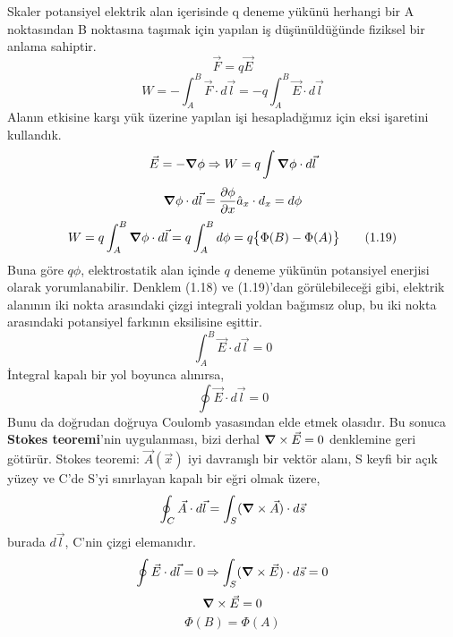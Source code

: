 \begin{theorem}
Skaler potansiyel elektrik alan içerisinde q deneme yükünü herhangi bir A noktasından B noktasına taşımak için yapılan iş düşünüldüğünde fiziksel bir anlama sahiptir.
\[\Vec{F} = q \Vec{E} \]
\[ W = - \int_{A}^{B} \Vec{F} \cdot d\Vec{l} = -q \int_{A}^{B} \Vec{E} \cdot d\Vec{l} \tag{1.18}\]
Alanın etkisine karşı yük üzerine yapılan işi hesapladığımız için eksi işaretini kullandık.
\[ \Vec{E} = - \grad \phi \Rightarrow W = q \int \grad \phi \cdot  d\Vec{l} \]
\[ \grad \phi \cdot  d\Vec{l} = \dfrac{\partial \phi}{\partial x} \hat{a}_{x} \cdot d_{x} = d \phi \]
\[ W = q \int_{A}^{B} \grad \phi \cdot  d\Vec{l} = q \int_{A}^{B} d \phi = q \big\{ \Phi(B) - \Phi(A) \big\} \tag{1.19} \]
Buna göre $q\phi$, elektrostatik alan içinde $q$ deneme yükünün potansiyel enerjisi olarak yorumlanabilir. Denklem (1.18) ve (1.19)'dan görülebileceği gibi, elektrik alanının iki nokta arasındaki çizgi integrali yoldan bağımsız olup, bu iki nokta arasındaki potansiyel farkının eksilisine eşittir.
\[ \int_{A}^{B} \Vec{E} \cdot d\Vec{l} = 0 \tag{1.20}\]
İntegral kapalı bir yol boyunca alınırsa,
\[ \oint \Vec{E} \cdot d\Vec{l} = 0 \tag{1.21} \]
Bunu da doğrudan doğruya Coulomb yasasından elde etmek olasıdır. Bu sonuca \textbf{Stokes teoremi}'nin uygulanması, bizi derhal $\grad \times \Vec{E} = 0$ denklemine geri götürür. Stokes teoremi: $\Vec{A}(\Vec{x})$ iyi davranışlı bir vektör alanı, S keyfi bir açık yüzey ve C'de S'yi sınırlayan kapalı bir eğri olmak üzere,
\[ \oint_{C} \Vec{A} \cdot d\Vec{l} = \int_{S} (\grad \times \Vec{A}) \cdot d\Vec{s} \]
burada $d\Vec{l}$, C'nin çizgi elemanıdır.
\[ \oint \Vec{E} \cdot d\Vec{l} = 0 \Rightarrow \int_{S} (\grad \times \Vec{E} ) \cdot d\Vec{s} = 0  \]
\[ \grad \times \Vec{E} = 0 \]
\[ \Phi (B) = \Phi (A) \]
\end{theorem}


